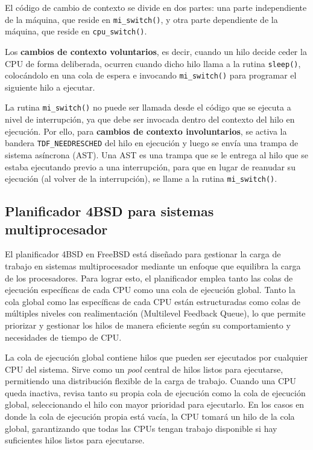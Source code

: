 El código de cambio de contexto se divide en dos partes: una parte independiente de la máquina, que reside en \verb|mi_switch()|, y otra parte dependiente de la máquina, que reside en \verb|cpu_switch()|.\par

Los \textbf{cambios de contexto voluntarios}, es decir, cuando un hilo decide ceder la CPU de forma deliberada, ocurren cuando dicho hilo llama a la rutina \verb|sleep()|, colocándolo en una cola de espera e invocando \verb|mi_switch()| para programar el siguiente hilo a ejecutar.\par

La rutina \verb|mi_switch()| no puede ser llamada desde el código que se ejecuta a nivel de interrupción, ya que debe ser invocada dentro del contexto del hilo en ejecución. Por ello, para \textbf{cambios de contexto involuntarios}, se activa la bandera \verb|TDF_NEEDRESCHED| del hilo en ejecución y luego se envía una trampa de sistema asíncrona (AST). Una AST es una trampa que se le entrega al hilo que se estaba ejecutando previo a una interrupción, para que en lugar de reanudar su ejecución (al volver de la interrupción), se llame a la rutina \verb|mi_switch()|.\par

\subsection{Planificador 4BSD para sistemas multiprocesador}

El planificador 4BSD en FreeBSD está diseñado para gestionar la carga de trabajo en sistemas multiprocesador mediante un enfoque que equilibra la carga de los procesadores. Para lograr esto, el planificador emplea tanto las colas de ejecución específicas de cada CPU como una cola de ejecución global. Tanto la cola global como las específicas de cada CPU están estructuradas como colas de múltiples niveles con realimentación (Multilevel Feedback Queue), lo que permite priorizar y gestionar los hilos de manera eficiente según su comportamiento y necesidades de tiempo de CPU.

La cola de ejecución global contiene hilos que pueden ser ejecutados por cualquier CPU del sistema. Sirve como un \textit{pool} central de hilos listos para ejecutarse, permitiendo una distribución flexible de la carga de trabajo. Cuando una CPU queda inactiva, revisa tanto su propia cola de ejecución como la cola de ejecución global, seleccionando el hilo con mayor prioridad para ejecutarlo. En los casos en donde la cola de ejecución propia está vacía, la CPU tomará un hilo de la cola global, garantizando que todas las CPUs tengan trabajo disponible si hay suficientes hilos listos para ejecutarse.


